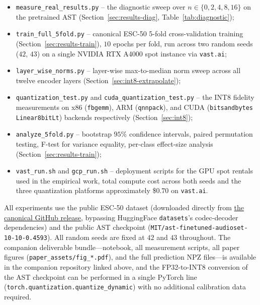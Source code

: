 \documentclass[conference]{IEEEtran}
\begin{document}
\begin{itemize}[leftmargin=2.2em]
    \item \texttt{measure\_real\_results.py} -- the diagnostic sweep over $n \in \{0, 2, 4, 8, 16\}$ on the pretrained AST (Section~\ref{sec:results-diag}, Table~\ref{tab:diagnostic});
    \item \texttt{train\_full\_5fold.py} -- canonical ESC-50 5-fold cross-validation training (Section~\ref{sec:results-train}), $10$ epochs per fold, run across two random seeds ($42$, $43$) on a single NVIDIA RTX A4000 spot instance via \texttt{vast.ai};
    \item \texttt{layer\_wise\_norms.py} -- layer-wise max-to-median norm sweep across all twelve encoder layers (Section~\ref{sec:int8-extrapolate});
    \item \texttt{quantization\_test.py} and \texttt{cuda\_quantization\_test.py} -- the INT8 fidelity measurements on x86 (\texttt{fbgemm}), ARM (\texttt{qnnpack}), and CUDA (\texttt{bitsandbytes Linear8bitLt}) backends respectively (Section~\ref{sec:int8});
    \item \texttt{analyze\_5fold.py} -- bootstrap $95\%$ confidence intervals, paired permutation testing, F-test for variance equality, per-class effect-size analysis (Section~\ref{sec:results-train});
    \item \texttt{vast\_run.sh} and \texttt{gcp\_run.sh} -- deployment scripts for the GPU spot rentals used in the empirical work, total compute cost across both seeds and the three quantization platforms approximately \$$0.70$ on \texttt{vast.ai}.
\end{itemize}

All experiments use the public ESC-50 dataset (downloaded directly from \href{https://github.com/karolpiczak/ESC-50}{the canonical GitHub release}, bypassing HuggingFace \texttt{datasets}'s codec-decoder dependencies) and the public AST checkpoint (\texttt{MIT/ast-finetuned-audioset-10-10-0.4593}). All random seeds are fixed at $42$ and $43$ throughout. The companion deliverable bundle---notebook, all measurement scripts, all paper figures (\texttt{paper\_assets/fig\_*.pdf}), and the full prediction NPZ files---is available in the companion repository linked above, and the FP32-to-INT8 conversion of the AST checkpoint can be performed in a single PyTorch line (\texttt{torch.quantization.quantize\_dynamic}) with no additional calibration data required.
\end{document}
